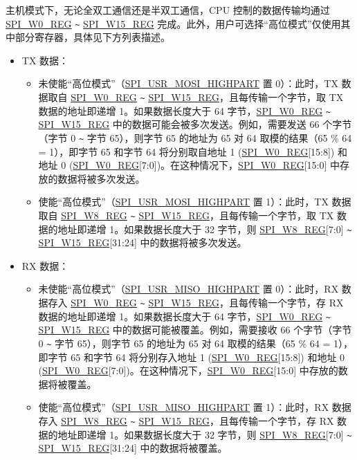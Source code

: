 \documentclass[main\_\_CN.tex]{subfiles}
\begin{document}
主机模式下，无论全双工通信还是半双工通信，CPU 控制的数据传输均通过 \hyperref[regdesc:SPIW0REG]{SPI\_W0\_REG} \verb+~+ \hyperref[regdesc:SPIW15REG]{SPI\_W15\_REG} 完成。此外，用户可选择“高位模式”仅使用其中部分寄存器，具体见下方列表描述。
\begin{itemize}
    \item TX 数据：
    \begin{itemize}
        \item 未使能“高位模式”（\hyperref[fielddesc:SPIUSRMOSIHIGHPART]{SPI\_USR\_MOSI\_HIGHPART} 置 0）：此时，TX 数据取自 \hyperref[regdesc:SPIW0REG]{SPI\_W0\_REG} \verb+~+ \hyperref[regdesc:SPIW15REG]{SPI\_W15\_REG}，且每传输一个字节，取 TX 数据的地址即递增 1。如果数据长度大于 64 字节，\hyperref[regdesc:SPIW0REG]{SPI\_W0\_REG} \verb+~+ \hyperref[regdesc:SPIW15REG]{SPI\_W15\_REG} 中的数据可能会被多次发送。例如，需要发送 66 个字节（字节 0 \verb+~+ 字节 65），则字节 65 的地址为 65 对 64 取模的结果（65 \% 64 = 1），即字节 65 和字节 64 将分别取自地址 1 (\hyperref[regdesc:SPIW0REG]{SPI\_W0\_REG}[15:8]) 和地址 0 (\hyperref[regdesc:SPIW0REG]{SPI\_W0\_REG}[7:0])。在这种情况下，\hyperref[regdesc:SPIW0REG]{SPI\_W0\_REG}[15:0] 中存放的数据将被多次发送。
        \item 使能“高位模式”（\hyperref[fielddesc:SPIUSRMOSIHIGHPART]{SPI\_USR\_MOSI\_HIGHPART} 置 1）：此时，TX 数据取自 \hyperref[regdesc:SPIW8REG]{SPI\_W8\_REG} \verb+~+ \hyperref[regdesc:SPIW15REG]{SPI\_W15\_REG}，且每传输一个字节，取 TX 数据的地址即递增 1。如果数据长度大于 32 字节，则 \hyperref[regdesc:SPIW8REG]{SPI\_W8\_REG}[7:0] \verb+~+ \hyperref[regdesc:SPIW15REG]{SPI\_W15\_REG}[31:24] 中的数据将被多次发送。
    \end{itemize}
    \item RX 数据：
    \begin{itemize}
        \item 未使能“高位模式”（\hyperref[fielddesc:SPIUSRMISOHIGHPART]{SPI\_USR\_MISO\_HIGHPART} 置 0）：此时，RX 数据存入 \hyperref[regdesc:SPIW0REG]{SPI\_W0\_REG} \verb+~+ \hyperref[regdesc:SPIW15REG]{SPI\_W15\_REG}，且每传输一个字节，存 RX 数据的地址即递增 1。如果数据长度大于 64 字节，\hyperref[regdesc:SPIW0REG]{SPI\_W0\_REG} \verb+~+ \hyperref[regdesc:SPIW15REG]{SPI\_W15\_REG} 中的数据可能被覆盖。例如，需要接收 66 个字节（字节 0 \verb+~+ 字节 65），则字节 65 的地址为 65 对 64 取模的结果（65 \% 64 = 1），即字节 65 和字节 64 将分别存入地址 1 (\hyperref[regdesc:SPIW0REG]{SPI\_W0\_REG}[15:8]) 和地址 0 (\hyperref[regdesc:SPIW0REG]{SPI\_W0\_REG}[7:0])。在这种情况下，\hyperref[regdesc:SPIW0REG]{SPI\_W0\_REG}[15:0] 中存放的数据将被覆盖。
        \item 使能“高位模式”（\hyperref[fielddesc:SPIUSRMISOHIGHPART]{SPI\_USR\_MISO\_HIGHPART} 置 1）：此时，RX 数据存入 \hyperref[regdesc:SPIW8REG]{SPI\_W8\_REG} \verb+~+ \hyperref[regdesc:SPIW15REG]{SPI\_W15\_REG}，且每传输一个字节，存 RX 数据的地址即递增 1。如果数据长度大于 32 字节，则 \hyperref[regdesc:SPIW8REG]{SPI\_W8\_REG}[7:0] \verb+~+ \hyperref[regdesc:SPIW15REG]{SPI\_W15\_REG}[31:24] 中的数据将被覆盖。
    \end{itemize}
\end{itemize}
\end{document}

